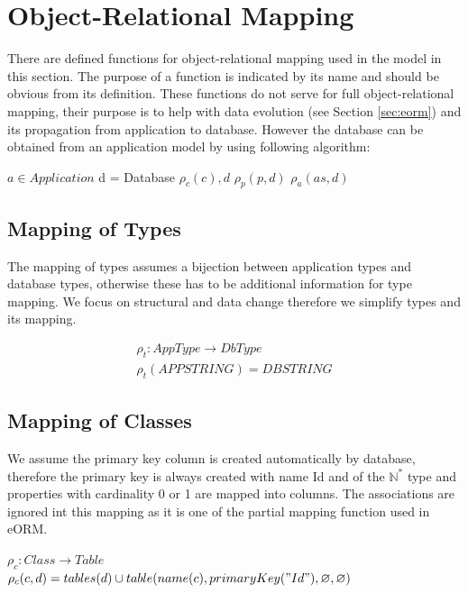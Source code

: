 \documentclass[11pt]{article}
\begin{document}
\section{Object-Relational Mapping}
\label{sec:orm}
There are defined functions for object-relational mapping used in the model in this section. The purpose of a function is indicated by its name and should be obvious from its definition. These functions do not serve for full object-relational mapping, their purpose is to help with data evolution (see Section \ref{sec:eorm}) and its propagation from application to database. However the database can be obtained from an application model by using following algorithm:

\begin{algorithmic}[1]
	\Require $a \in Application$
	\State d = Database
		\State $\rho_c(c), d$
			\State $\rho_p(p, d)$
		\EndFor
	 \EndFor
			\State $\rho_{a}(as, d)$
		\EndFor
	\EndFor
\end{algorithmic}


\subsection{Mapping of Types}
The mapping of types assumes a bijection between application types and database types, otherwise these has to be additional information for type mapping. We focus on structural and data change therefore we simplify types and its mapping.

\begin{equation*}
\begin{gathered}
	\rho_{t} : AppType \rightarrow DbType  \\
 	\rho_{t}(APPSTRING) = DBSTRING 
\end{gathered}
\end{equation*}

\subsection{Mapping of Classes}
We assume the primary key column is created automatically by database, therefore the primary key is always created with name Id and of the $\mathbb{N^{*}}$ type and properties with cardinality 0 or 1 are mapped into columns. The associations are ignored int this mapping as it is one of the partial mapping function used in eORM.

\begin{center}
$\rho_{c}: Class \rightarrow Table $ \\ 
$\rho_{c}(c,d) = tables(d) \cup table(name(c), primaryKey("Id"), \varnothing, \varnothing) $
\end{center}
\end{document}
